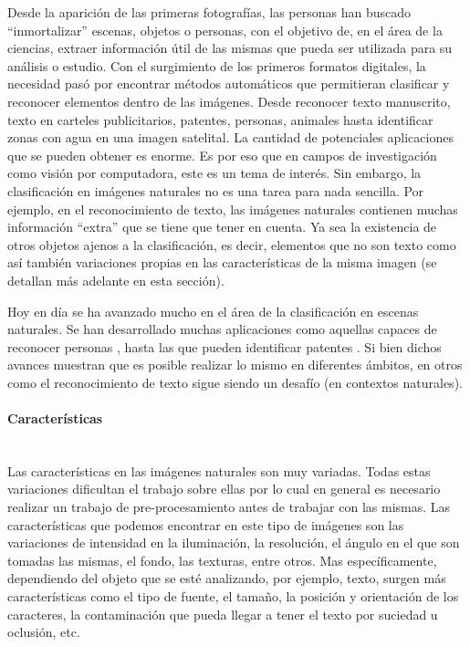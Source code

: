 	Desde la aparición de las primeras fotografías, las personas han buscado ``inmortalizar'' escenas, objetos o personas, con el objetivo de, en el área de la ciencias, extraer información útil de las mismas que pueda ser utilizada para su análisis o estudio. Con el surgimiento de los primeros formatos digitales, la necesidad pasó por encontrar métodos automáticos que permitieran clasificar y reconocer elementos dentro de las imágenes. Desde reconocer texto manuscrito, texto en carteles publicitarios, patentes, personas, animales hasta identificar zonas con agua en una imagen satelital. La cantidad de potenciales aplicaciones que se pueden obtener es enorme. Es por eso que en campos de investigación como visión por computadora, este es un tema de interés. Sin embargo, la clasificación en imágenes naturales no es una tarea para nada sencilla. Por ejemplo, en el reconocimiento de texto, las imágenes naturales contienen muchas información ``extra'' que se tiene que tener en cuenta. Ya sea la existencia de otros objetos ajenos a la clasificación, es decir, elementos que no son texto como así también variaciones propias en las características de la misma imagen (se detallan más adelante en esta sección).
	
	Hoy en día se ha avanzado mucho en el área de la clasificación en escenas naturales. Se han desarrollado muchas aplicaciones como aquellas capaces de reconocer personas \cite{DT05}, hasta las que pueden identificar patentes \cite{DAB}. Si bien dichos avances muestran que es posible realizar lo mismo en diferentes ámbitos, en otros como el reconocimiento de texto sigue siendo un desafío (en contextos naturales).
	
	
\paragraph{Características} ~\\
	
	Las características en las imágenes naturales son muy variadas. Todas estas variaciones dificultan el trabajo sobre ellas por lo cual en general es necesario realizar un trabajo de pre-procesamiento antes de trabajar con las mismas. Las características que podemos encontrar en este tipo de imágenes son las variaciones de intensidad en la iluminación, la resolución, el ángulo en el que son tomadas las mismas, el fondo, las texturas, entre otros. Mas específicamente, dependiendo del objeto que se esté analizando, por ejemplo, texto, surgen más características como el tipo de fuente, el tamaño, la posición y orientación de los caracteres, la contaminación que pueda llegar a tener el texto por suciedad u oclusión, etc.
	
